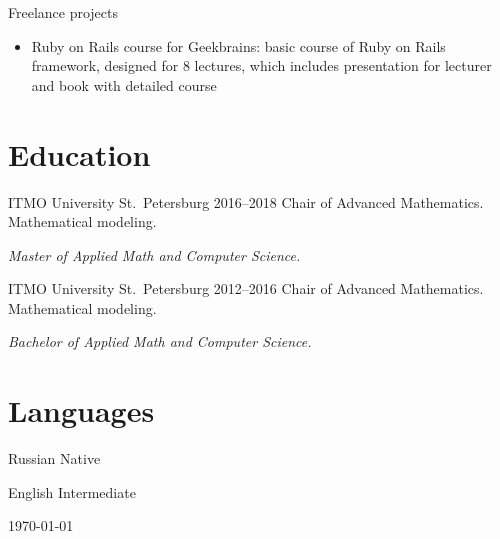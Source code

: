 \documentclass{cv}
\begin{document}
\begin{cvblock}{Freelance projects}
	\begin{itemize}
		\item Ruby on Rails course for Geekbrains:
		      basic course of Ruby on Rails framework, designed for 8 lectures, which
		      includes presentation for lecturer and book with detailed course
	\end{itemize}
\end{cvblock}

\section{Education}

\begin{cvblock}{%
		\blocktitle
		{ITMO University}
		{St.~Petersburg}
		{}
		{2016--2018}}
	Chair of Advanced Mathematics. Mathematical modeling.
	\vspace{1em}

	\textit{Master of Applied Math and Computer Science.}
\end{cvblock}

\begin{cvblock}{%
		\blocktitle
		{ITMO University}
		{St.~Petersburg}
		{}
		{2012--2016}}
	Chair of Advanced Mathematics. Mathematical modeling.
	\vspace{1em}

	\textit{Bachelor of Applied Math and Computer Science.}
\end{cvblock}

\section{Languages}

\begin{cvblock}{Russian}
	Native
\end{cvblock}

\begin{cvblock}{English}
	Intermediate
\end{cvblock}

\vfill
\begin{center}
	\monthyear\today
\end{center}
\end{document}
